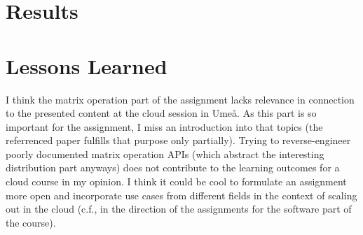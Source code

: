 \documentclass{prog_report}
\begin{document}
\section{Results}



\section{Lessons Learned}
I think the matrix operation part of the assignment lacks relevance in connection to the presented content at the cloud session in Umeå.
As this part is so important for the assignment, I miss an introduction into that topics (the referrenced paper fulfills that purpose only partially).
Trying to reverse-engineer poorly documented matrix operation APIs (which abstract the interesting distribution part anyways) does not contribute to the learning outcomes for a cloud course in my opinion.
I think it could be cool to formulate an assignment more open and incorporate use cases from different fields in the context of scaling out in the cloud (c.f., in the direction of the assignments for the software part of the course).



\end{document}
